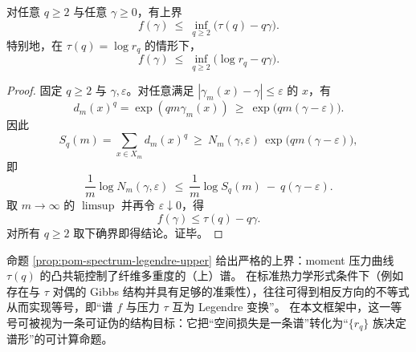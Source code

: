 

\begin{proposition}\label{prop:pom-spectrum-legendre-upper}
对任意 \(q\ge 2\) 与任意 \(\gamma\ge 0\)，有上界
$$
f(\gamma)\ \le\ \inf_{q\ge 2}\bigl(\tau(q)-q\gamma\bigr).
$$
特别地，在 \(\tau(q)=\log r_q\) 的情形下，
$$
f(\gamma)\ \le\ \inf_{q\ge 2}\bigl(\log r_q-q\gamma\bigr).
$$
\end{proposition}

\begin{proof}
固定 \(q\ge 2\) 与 \(\gamma,\varepsilon\)。对任意满足 \(|\gamma_m(x)-\gamma|\le\varepsilon\) 的 \(x\)，有
$$
d_m(x)^q=\exp(qm\gamma_m(x))\ \ge\ \exp\bigl(qm(\gamma-\varepsilon)\bigr).
$$
因此
$$
S_q(m)=\sum_{x\in X_m} d_m(x)^q
\ \ge\ N_m(\gamma,\varepsilon)\,\exp\bigl(qm(\gamma-\varepsilon)\bigr),
$$
即
$$
\frac{1}{m}\log N_m(\gamma,\varepsilon)\ \le\ \frac{1}{m}\log S_q(m)\ -\ q(\gamma-\varepsilon).
$$
取 \(m\to\infty\) 的 \(\limsup\) 并再令 \(\varepsilon\downarrow 0\)，得
$$
f(\gamma)\le \tau(q)-q\gamma.
$$
对所有 \(q\ge 2\) 取下确界即得结论。证毕。
\end{proof}

\begin{remark}\label{rem:pom-spectrum-formalism}
命题 \ref{prop:pom-spectrum-legendre-upper} 给出严格的上界：moment 压力曲线 \(\tau(q)\) 的凸共轭控制了纤维多重度的（上）谱。
在标准热力学形式条件下（例如存在与 \(\tau\) 对偶的 Gibbs 结构并具有足够的准乘性），往往可得到相反方向的不等式从而实现等号，即“谱 \(f\) 与压力 \(\tau\) 互为 Legendre 变换”。
在本文框架中，这一等号可被视为一条可证伪的结构目标：它把“空间损失是一条谱”转化为“\(\{r_q\}\) 族决定谱形”的可计算命题。
\end{remark}

